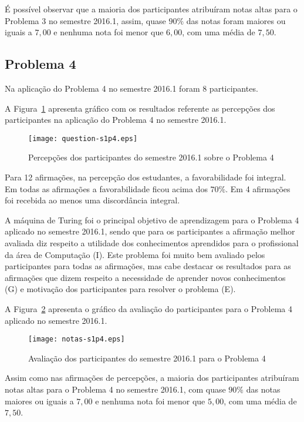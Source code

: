 É possível observar que a maioria dos participantes atribuíram
notas altas para o Problema 3 no semestre 2016.1, assim, quase $90\%$ das notas
foram maiores ou iguais a $7,00$ e nenhuma nota foi menor que $6,00$, com uma média
de $7,50$.

\subsection{Problema 4}
Na aplicação do Problema 4 no semestre 2016.1 foram 8 participantes.

A Figura~\ref{percep-s1p4} apresenta gráfico com os resultados referente
as percepções dos participantes na aplicação do
Problema 4 no semestre 2016.1.

\begin{figure}[!htb]
\centering
\texttt{[image: question-s1p4.eps]}
\caption{Percepções dos participantes do semestre 2016.1 sobre o Problema 4}
\label{percep-s1p4}
\end{figure}

Para 12 afirmações, na percepção dos estudantes, a favorabilidade foi integral.
Em todas as afirmações a favorabilidade ficou acima dos $70\%$.
Em 4 afirmações foi recebida ao menos uma discordância integral.

A máquina de Turing foi o principal objetivo de aprendizagem para o Problema 4
aplicado no semestre 2016.1, sendo que para os participantes a afirmação
melhor avaliada diz respeito a utilidade dos conhecimentos aprendidos para 
o profissional da área de Computação (I).
Este problema foi muito bem avaliado pelos participantes para todas
as afirmações, mas cabe destacar os resultados para as afirmações que
dizem respeito a necessidade de aprender novos conhecimentos (G) e
motivação dos participantes para resolver o problema (E).

A Figura~\ref{aval-s1p4} apresenta o gráfico da
avaliação do participantes para o Problema 4 aplicado no semestre 2016.1.

\begin{figure}[!htb]
\centering
\texttt{[image: notas-s1p4.eps]}
\caption{Avaliação dos participantes do semestre 2016.1 para o Problema 4}
\label{aval-s1p4}
\end{figure}

Assim como nas afirmações de percepções, a maioria dos participantes
atribuíram notas altas para o Problema 4 no semestre 2016.1,
com quase $90\%$ das notas maiores ou iguais a $7,00$ e nenhuma nota
foi menor que $5,00$, com uma média de $7,50$.

